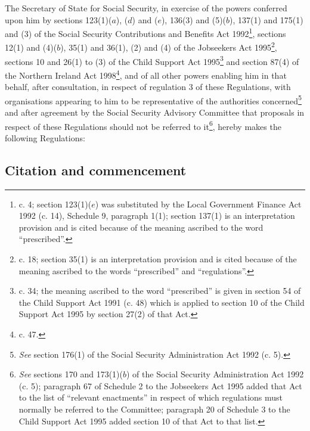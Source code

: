 \documentclass[12pt,a4paper]{article}
\title{\regstitle}
\author{S.I. 2000 No. 3176}
\date{Made 30th November 2000\\Laid before Parliament 6th December 2000\\Coming into force in accordance with regulation 1}
\begin{document}
\maketitle

\noindent
The Secretary of State for Social Security, in exercise of the powers conferred upon him by sections 123(1)($a$), ($d$)  and ($e$), 136(3) and (5)($b$), 137(1) and 175(1) and (3) of the Social Security Contributions and Benefits Act 1992\footnote{ c. 4; section 123(1)($e$)  was substituted by the Local Government Finance Act 1992 (c. 14), Schedule 9, paragraph 1(1); section 137(1) is an interpretation provision and is cited because of the meaning ascribed to the word “prescribed”.}, sections 12(1) and (4)($b$), 35(1) and 36(1), (2) and (4) of the Jobseekers Act 1995\footnote{ c. 18; section 35(1) is an interpretation provision and is cited because of the meaning ascribed to the words “prescribed” and “regulations”.}, sections 10 and 26(1) to (3) of the Child Support Act 1995\footnote{ c. 34; the meaning ascribed to the word “prescribed” is given in section 54 of the Child Support Act 1991 (c. 48) which is applied to section 10 of the Child Support Act 1995 by section 27(2) of that Act.} and section 87(4) of the Northern Ireland Act 1998\footnote{ c. 47.}, and of all other powers enabling him in that behalf, after consultation, in respect of regulation 3 of these Regulations, with organisations appearing to him to be representative of the authorities concerned\footnote{\frenchspacing \emph{See} section 176(1) of the Social Security Administration Act 1992 (c. 5).} and after agreement by the Social Security Advisory Committee that proposals in respect of these Regulations should not be referred to it\footnote{\frenchspacing \emph{See} sections 170 and 173(1)($b$) of the Social Security Administration Act 1992 (c. 5); paragraph 67 of Schedule 2 to the Jobseekers Act 1995 added that Act to the list of “relevant enactments” in respect of which regulations must normally be referred to the Committee; paragraph 20 of Schedule 3 to the Child Support Act 1995 added section 10 of that Act to that list.}, hereby makes the following Regulations:  

{\sloppy

\tableofcontents

}

\bigskip

\setcounter{secnumdepth}{-2}

\subsection[1. Citation and commencement]{Citation and commencement}
\end{document}
